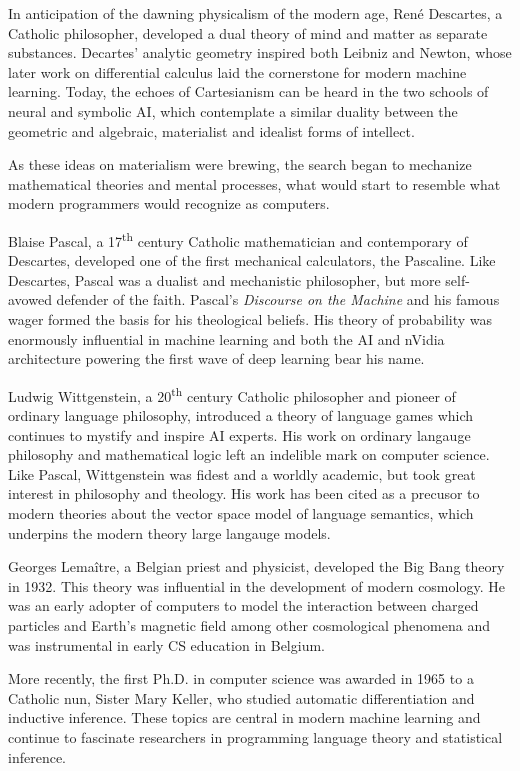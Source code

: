 \documentclass[sigplan,nonacm]{acmart}\settopmatter{printfolios=false,printccs=false,printacmref=false}
\begin{document}
  In anticipation of the dawning physicalism of the modern age, Ren\'e Descartes, a Catholic philosopher, developed a dual theory of mind and matter as separate substances. Decartes' analytic geometry inspired both Leibniz and Newton, whose later work on differential calculus laid the cornerstone for modern machine learning. Today, the echoes of Cartesianism can be heard in the two schools of neural and symbolic AI, which contemplate a similar duality between the geometric and algebraic, materialist and idealist forms of intellect.

  As these ideas on materialism were brewing, the search began to mechanize mathematical theories and mental processes, what would start to resemble what modern programmers would recognize as computers.

  Blaise Pascal, a 17\textsuperscript{th} century Catholic mathematician and contemporary of Descartes, developed one of the first mechanical calculators, the Pascaline. Like Descartes, Pascal was a dualist and mechanistic philosopher, but more self-avowed defender of the faith. Pascal's \textit{Discourse on the Machine} and his famous wager formed the basis for his theological beliefs. His theory of probability was enormously influential in machine learning and both the AI and nVidia architecture powering the first wave of deep learning bear his name.

  Ludwig Wittgenstein, a 20\textsuperscript{th} century Catholic philosopher and pioneer of ordinary language philosophy, introduced a theory of language games which continues to mystify and inspire AI experts. His work on ordinary langauge philosophy and mathematical logic left an indelible mark on computer science. Like Pascal, Wittgenstein was fidest and a worldly academic, but took great interest in philosophy and theology. His work has been cited as a precusor to modern theories about the vector space model of language semantics, which underpins the modern theory large langauge models.

  Georges Lema\^itre, a Belgian priest and physicist, developed the Big Bang theory in 1932. This theory was influential in the development of modern cosmology. He was an early adopter of computers to model the interaction between charged particles and Earth's magnetic field among other cosmological phenomena and was instrumental in early CS education in Belgium.

  More recently, the first Ph.D. in computer science was awarded in 1965 to a Catholic nun, Sister Mary Keller, who studied automatic differentiation and inductive inference. These topics are central in modern machine learning and continue to fascinate researchers in programming language theory and statistical inference.
\end{document}
